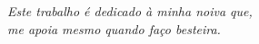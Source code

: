 \begin{dedicatoria}
   \vspace*{\fill}
   \centering
   \noindent
   \textit{ Este trabalho é dedicado à minha noiva que,\\
   me apoia mesmo quando faço besteira.} 

   
   \vspace*{\fill}
   

\end{dedicatoria}
